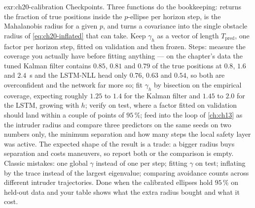 \begin{solution}{exr:ch20-calibration}
Checkpoints. Three functions do the bookkeeping:  returns the fraction
of true positions inside the $p$-ellipse per horizon step,  is the
Mahalanobis radius for a given $p$, and  turns a covariance into
the single obstacle radius of \cref{eq:ch20-inflated} that \orca can take. Keep $\gamma_h$
as a vector of length $T_{\mathrm{pred}}$, one factor per horizon step, fitted on
validation and then frozen. Steps: measure the coverage you actually have before fitting
anything --- on the chapter's data the tuned Kalman filter contains $0.85$, $0.81$ and
$0.79$ of the true positions at $0.8$, $1.6$ and $2.4$~s and the LSTM-NLL head only
$0.76$, $0.63$ and $0.54$, so both are overconfident and the network far more so; fit
$\gamma_h$ by bisection on the empirical coverage, expecting roughly $1.25$ to $1.4$ for
the Kalman filter and $1.45$ to $2.0$ for the LSTM, growing with $h$; verify on test,
where a factor fitted on validation should land within a couple of points of $95\,\%$;
feed  into the \orca loop of \cref{ch:ch13} as the intruder radius
and compare three predictors on the same seeds on two numbers only, the minimum separation
and how many steps the local safety layer was active. The expected shape of the result is a
trade: a bigger radius buys separation and costs maneuvers, so report both or the
comparison is empty. Classic mistakes: one global $\gamma$ instead of one per step;
fitting $\gamma$ on test; inflating by the trace instead of the largest eigenvalue;
comparing avoidance counts across different intruder trajectories. Done when the
calibrated ellipses hold $95\,\%$ on held-out data and your \orca table shows what the
extra radius bought and what it cost.
\end{solution}
